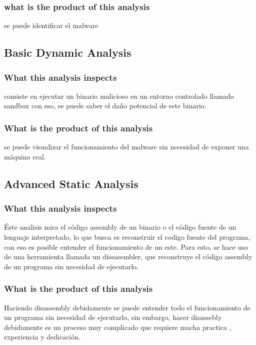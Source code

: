 \documentclass[10pt,a4paper]{article} %
\begin{document}
                \subsubsection{what is the product of this analysis}
                    se puede identificar el malware

            \subsection{Basic Dynamic Analysis}
                \subsubsection{What this analysis inspects}
                    consiste en ejecutar un binario malicioso en un entorno
                    controlado llamado sandbox con eso, se puede saber el daño
                    potencial de este binario.

                \subsubsection{What is the product of this analysis}
                    se puede visualizar el funcionamiento del malware sin
                    necesidad de exponer una máquina real.

            \subsection{Advanced Static Analysis}
                \subsubsection{What this analysis inspects}
                    Éste analisis mira el código assembly de un binario o el
                    código fuente de un lenguaje interpretado, lo que busca es
                    reconstruir el codigo fuente del programa, con eso es
                    posible entender el funcionamiento de un este. Para
                    esto, se hace uso de una herramienta llamada un
                    dissasembler, que reconstruye el código assembly de un
                    programa sin necesidad de ejecutarlo.

                \subsubsection{What is the product of this analysis}
                    Haciendo disassembly debidamente se puede entender todo el
                    funcionamiento de un programa sin necesidad de ejecutarlo,
                    sin embargo, hacer disassebly debidamente es un proceso muy
                    complicado que requiere mucha practica , experiencia y dedicación.
\end{document}
